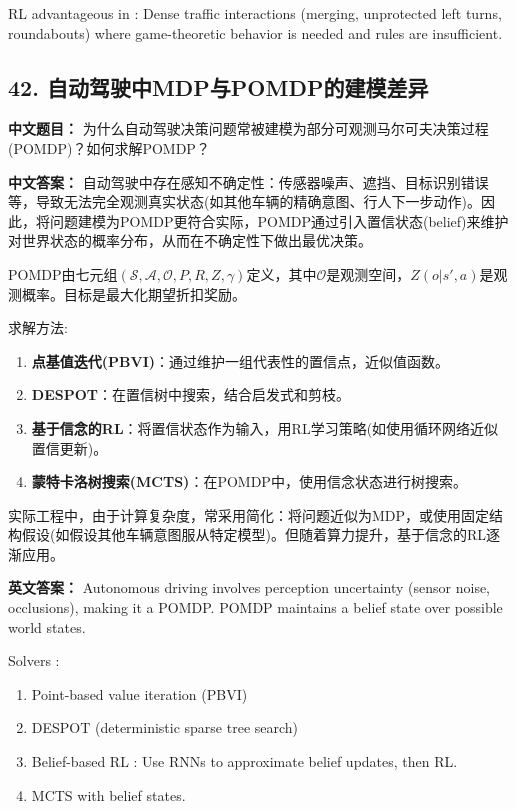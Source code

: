 \documentclass[10pt,a4paper]{ctexart}
\begin{document}
 RL advantageous in : Dense traffic interactions (merging, unprotected left turns, roundabouts) where game-theoretic behavior is needed and rules are insufficient.

\subsection*{42. 自动驾驶中MDP与POMDP的建模差异}
\textbf{中文题目：} 为什么自动驾驶决策问题常被建模为部分可观测马尔可夫决策过程(POMDP)？如何求解POMDP？

\textbf{中文答案：}  
自动驾驶中存在感知不确定性：传感器噪声、遮挡、目标识别错误等，导致无法完全观测真实状态(如其他车辆的精确意图、行人下一步动作)。因此，将问题建模为POMDP更符合实际，POMDP通过引入置信状态(belief)来维护对世界状态的概率分布，从而在不确定性下做出最优决策。

POMDP由七元组\((\mathcal{S}, \mathcal{A}, \mathcal{O}, P, R, Z, \gamma)\)定义，其中\(\mathcal{O}\)是观测空间，\(Z(o|s',a)\)是观测概率。目标是最大化期望折扣奖励。

 求解方法:
\begin{enumerate}
    \item \textbf{点基值迭代(PBVI)}：通过维护一组代表性的置信点，近似值函数。
    \item \textbf{DESPOT}：在置信树中搜索，结合启发式和剪枝。
    \item \textbf{基于信念的RL}：将置信状态作为输入，用RL学习策略(如使用循环网络近似置信更新)。
    \item \textbf{蒙特卡洛树搜索(MCTS)}：在POMDP中，使用信念状态进行树搜索。
\end{enumerate}

实际工程中，由于计算复杂度，常采用简化：将问题近似为MDP，或使用固定结构假设(如假设其他车辆意图服从特定模型)。但随着算力提升，基于信念的RL逐渐应用。

\textbf{英文答案：}  
Autonomous driving involves perception uncertainty (sensor noise, occlusions), making it a POMDP. POMDP maintains a belief state over possible world states.

 Solvers :
\begin{enumerate}
    \item Point-based value iteration (PBVI) 
    \item DESPOT  (deterministic sparse tree search)
    \item Belief-based RL : Use RNNs to approximate belief updates, then RL.
    \item MCTS  with belief states.
\end{enumerate}
\end{document}
